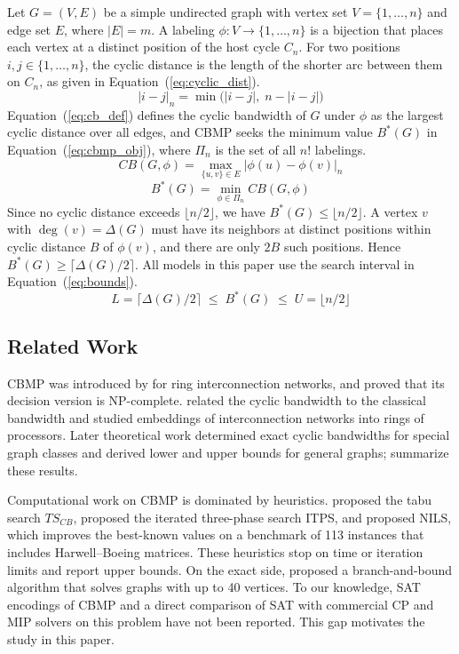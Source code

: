 \documentclass[a4paper,fleqn]{cas-sc}
\begin{document}
Let $G=(V,E)$ be a simple undirected graph with vertex set $V=\{1,\dots,n\}$ and edge set $E$, where $|E|=m$. A labeling $\phi\colon V\to\{1,\dots,n\}$ is a bijection that places each vertex at a distinct position of the host cycle $C_n$. For two positions $i,j\in\{1,\dots,n\}$, the cyclic distance is the length of the shorter arc between them on $C_n$, as given in Equation~(\ref{eq:cyclic_dist}).
\begin{equation}
    |i-j|_n=\min\bigl(|i-j|,\;n-|i-j|\bigr)
    \label{eq:cyclic_dist}
\end{equation}
Equation~(\ref{eq:cb_def}) defines the cyclic bandwidth of $G$ under $\phi$ as the largest cyclic distance over all edges, and CBMP seeks the minimum value $B^*(G)$ in Equation~(\ref{eq:cbmp_obj}), where $\Pi_n$ is the set of all $n!$ labelings.
\begin{equation}
    CB(G,\phi)=\max_{\{u,v\}\in E}|\phi(u)-\phi(v)|_n
    \label{eq:cb_def}
\end{equation}
\begin{equation}
    B^*(G)=\min_{\phi\in\Pi_n}CB(G,\phi)
    \label{eq:cbmp_obj}
\end{equation}
Since no cyclic distance exceeds $\lfloor n/2\rfloor$, we have $B^*(G)\le\lfloor n/2\rfloor$. A vertex $v$ with $\deg(v)=\Delta(G)$ must have its neighbors at distinct positions within cyclic distance $B$ of $\phi(v)$, and there are only $2B$ such positions. Hence $B^*(G)\ge\lceil\Delta(G)/2\rceil$. All models in this paper use the search interval in Equation~(\ref{eq:bounds}).
\begin{equation}
    L=\lceil\Delta(G)/2\rceil\;\le\;B^*(G)\;\le\;U=\lfloor n/2\rfloor
    \label{eq:bounds}
\end{equation}

\subsection{Related Work}

CBMP was introduced by \citet{leung1984} for ring interconnection networks, and \citet{lin1994} proved that its decision version is NP-complete. \citet{hromkovic1992} related the cyclic bandwidth to the classical bandwidth and studied embeddings of interconnection networks into rings of processors. Later theoretical work determined exact cyclic bandwidths for special graph classes and derived lower and upper bounds for general graphs; \citet{ren2020nils} summarize these results.

Computational work on CBMP is dominated by heuristics. \citet{rodrigueztello2015} proposed the tabu search $TS_{CB}$, \citet{ren2019} proposed the iterated three-phase search ITPS, and \citet{ren2020nils} proposed NILS, which improves the best-known values on a benchmark of 113 instances that includes Harwell--Boeing matrices. These heuristics stop on time or iteration limits and report upper bounds. On the exact side, \citet{romero2012} proposed a branch-and-bound algorithm that solves graphs with up to 40 vertices. To our knowledge, SAT encodings of CBMP and a direct comparison of SAT with commercial CP and MIP solvers on this problem have not been reported. This gap motivates the study in this paper.
\end{document}

